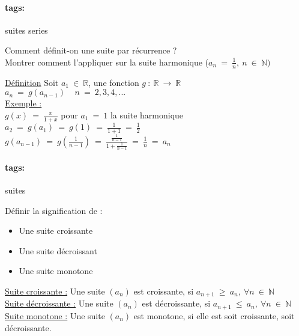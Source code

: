 \documentclass[12pt]{article}
\newcommand*{\xfield}[1]{\begin{mdframed}\centering #1\end{mdframed}\bigskip}
\newenvironment{note}{}{}
\newcommand*{\tags}[1]{\paragraph{tags: }#1}
\begin{document}
\begin{note}
	\tags{suites series}
    \xfield{
        Comment définit-on une suite par récurrence ?\\
        Montrer comment l'appliquer sur la suite harmonique ($a_n\ =\ \frac{1}{n},\ n\ \in\ \mathbb{N})$
    }
    \xfield{
        \underline{Définition} Soit $a_1\ \in\ \mathbb{R}$, une fonction $g\ :\ \mathbb{R}\ \rightarrow\ \mathbb{R}$\\
        $a_n\ =\ g(a_{n-1})\ \ \ \ \ n\ =\ 2,3,4,...$\\
        \underline{Exemple : }\\
        $g(x)\ =\ \frac{x}{1+x}$ pour $a_1\ =\ 1$ la suite harmonique\\
        $a_2\ =\ g(a_1)\ =\ g(1)\ =\ \frac{1}{1+1}\ =\ \frac{1}{2}$\\
        $g(a_{n-1})\ =\ g(\frac{1}{n-1})\ =\ \frac{\frac{1}{n-1}}{1+ \frac{1}{n-1}}\ =\ \frac{1}{n}\ =\ a_n$}
\end{note}

\begin{note}
	\tags{suites}
    \xfield{
        Définir la signification de :
        \begin{itemize}
        \item Une suite croissante
        \item Une suite décroissant
        \item Une suite monotone
        \end{itemize}
    }
    \xfield{
        \underline{Suite croissante :} Une suite $(a_n)$ est croissante, si $a_{n+1}\ \ge\ a_n,\ \forall n\ \in\ \mathbb{N}$\\
        \underline{Suite décroissante :} Une suite $(a_n)$ est décroissante, si $a_{n+1}\ \le\ a_n,\ \forall n\ \in\ \mathbb{N}$\\
                \underline{Suite monotone :} Une suite $(a_n)$ est monotone, si elle est soit croissante, soit décroissante.}
\end{note}
\end{document}
